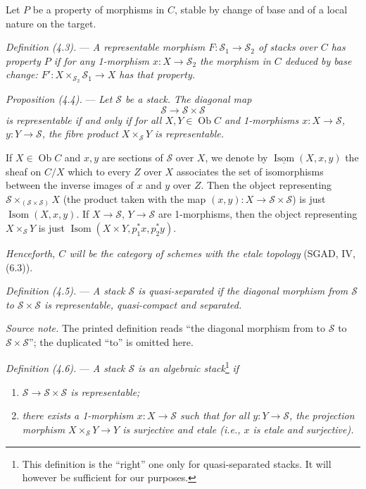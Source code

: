 \documentclass[10pt]{article}
\newcommand{\Isom}{\operatorname{Isom}}
\begin{document}
Let $P$ be a property of morphisms in $C$, stable by change of base and of a local nature on the target.

\medskip
\noindent\emph{Definition (4.3).} --- \emph{A representable morphism $F:\mathscr S_1\to\mathscr S_2$ of stacks over $C$ has property $P$ if for any 1-morphism $x:X\to\mathscr S_2$ the morphism in $C$ deduced by base change: $F':X\times_{\mathscr S_2}\mathscr S_1\to X$ has that property.}

\medskip
\noindent\emph{Proposition (4.4).} --- \emph{Let $\mathscr S$ be a stack. The diagonal map}
\[
\mathscr S\to\mathscr S\times\mathscr S
\]
\emph{is representable if and only if for all $X,Y\in\operatorname{Ob} C$ and 1-morphisms $x:X\to\mathscr S$, $y:Y\to\mathscr S$, the fibre product $X\times_{\mathscr S}Y$ is representable.}

If $X\in\operatorname{Ob} C$ and $x,y$ are sections of $\mathscr S$ over $X$, we denote by $\underline{\Isom}(X,x,y)$ the sheaf on $C/X$ which to every $Z$ over $X$ associates the set of isomorphisms between the inverse images of $x$ and $y$ over $Z$. Then the object representing $\mathscr S\times_{(\mathscr S\times\mathscr S)}X$ (the product taken with the map $(x,y):X\to\mathscr S\times\mathscr S$) is just $\Isom(X,x,y)$. If $X\to\mathscr S$, $Y\to\mathscr S$ are 1-morphisms, then the object representing $X\times_{\mathscr S}Y$ is just $\Isom(X\times Y,p_1^*x,p_2^*y)$.

\emph{Henceforth, $C$ will be the category of schemes with the etale topology} (SGAD, IV, (6.3)).

\medskip
\noindent\emph{Definition (4.5).} --- \emph{A stack $\mathscr S$ is quasi-separated if the diagonal morphism from $\mathscr S$ to $\mathscr S\times\mathscr S$ is representable, quasi-compact and separated.}

\smallskip
\noindent\textit{Source note.} The printed definition reads ``the diagonal morphism from to $\mathscr S$ to $\mathscr S\times\mathscr S$''; the duplicated ``to'' is omitted here.

\medskip
\noindent\emph{Definition (4.6).} --- \emph{A stack $\mathscr S$ is an algebraic stack}\footnote{This definition is the ``right'' one only for quasi-separated stacks. It will however be sufficient for our purposes.}\emph{ if}
\begin{enumerate}[label=(\roman*)]
\item \emph{$\mathscr S\to\mathscr S\times\mathscr S$ is representable;}
\item \emph{there exists a 1-morphism $x:X\to\mathscr S$ such that for all $y:Y\to\mathscr S$, the projection morphism $X\times_{\mathscr S}Y\to Y$ is surjective and etale (i.e., $x$ is etale and surjective).}
\end{enumerate}
\end{document}
